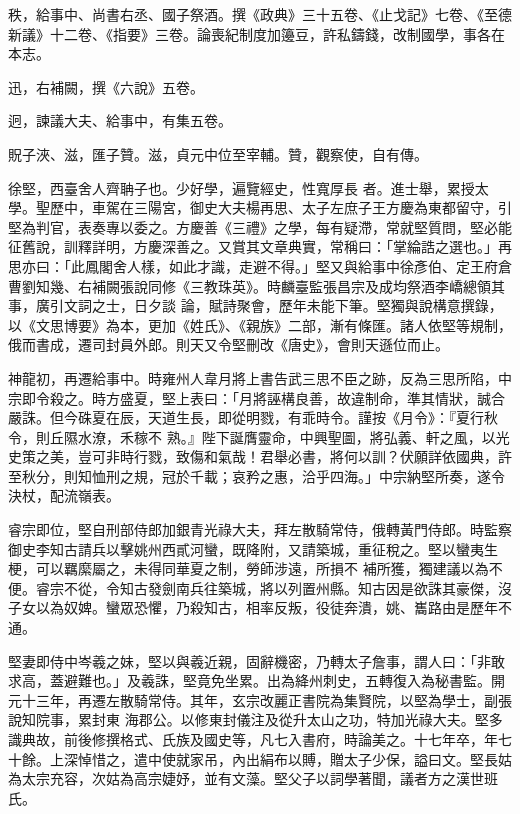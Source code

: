 \begin{pinyinscope}
 秩，給事中、尚書右丞、國子祭酒。撰《政典》三十五卷、《止戈記》七卷、《至德新議》十二卷、《指要》三卷。論喪紀制度加籩豆，許私鑄錢，改制國學，事各在本志。



 迅，右補闕，撰《六說》五卷。



 迥，諫議大夫、給事中，有集五卷。



 貺子浹、滋，匯子贊。滋，貞元中位至宰輔。贊，觀察使，自有傳。



 徐堅，西臺舍人齊聃子也。少好學，遍覽經史，性寬厚長
 者。進士舉，累授太學。聖歷中，車駕在三陽宮，御史大夫楊再思、太子左庶子王方慶為東都留守，引堅為判官，表奏專以委之。方慶善《三禮》之學，每有疑滯，常就堅質問，堅必能征舊說，訓釋詳明，方慶深善之。又賞其文章典實，常稱曰：「掌綸誥之選也。」再思亦曰：「此鳳閣舍人樣，如此才識，走避不得。」堅又與給事中徐彥伯、定王府倉曹劉知幾、右補闕張說同修《三教珠英》。時麟臺監張昌宗及成均祭酒李嶠總領其事，廣引文詞之士，日夕談
 論，賦詩聚會，歷年未能下筆。堅獨與說構意撰錄，以《文思博要》為本，更加《姓氏》、《親族》二部，漸有條匯。諸人依堅等規制，俄而書成，遷司封員外郎。則天又令堅刪改《唐史》，會則天遜位而止。



 神龍初，再遷給事中。時雍州人韋月將上書告武三思不臣之跡，反為三思所陷，中宗即令殺之。時方盛夏，堅上表曰：「月將誣構良善，故違制命，準其情狀，誠合嚴誅。但今硃夏在辰，天道生長，即從明戮，有乖時令。謹按《月令》：『夏行秋令，則丘隰水潦，禾稼不
 熟。』陛下誕膺靈命，中興聖圖，將弘義、軒之風，以光史策之美，豈可非時行戮，致傷和氣哉！君舉必書，將何以訓？伏願詳依國典，許至秋分，則知恤刑之規，冠於千載；哀矜之惠，洽乎四海。」中宗納堅所奏，遂令決杖，配流嶺表。



 睿宗即位，堅自刑部侍郎加銀青光祿大夫，拜左散騎常侍，俄轉黃門侍郎。時監察御史李知古請兵以擊姚州西貳河蠻，既降附，又請築城，重征稅之。堅以蠻夷生梗，可以羈縻屬之，未得同華夏之制，勞師涉遠，所損不
 補所獲，獨建議以為不便。睿宗不從，令知古發劍南兵往築城，將以列置州縣。知古因是欲誅其豪傑，沒子女以為奴婢。蠻眾恐懼，乃殺知古，相率反叛，役徒奔潰，姚、巂路由是歷年不通。



 堅妻即侍中岑羲之妹，堅以與羲近親，固辭機密，乃轉太子詹事，謂人曰：「非敢求高，蓋避難也。」及羲誅，堅竟免坐累。出為絳州刺史，五轉復入為秘書監。開元十三年，再遷左散騎常侍。其年，玄宗改麗正書院為集賢院，以堅為學士，副張說知院事，累封東
 海郡公。以修東封儀注及從升太山之功，特加光祿大夫。堅多識典故，前後修撰格式、氏族及國史等，凡七入書府，時論美之。十七年卒，年七十餘。上深悼惜之，遣中使就家吊，內出絹布以賻，贈太子少保，謚曰文。堅長姑為太宗充容，次姑為高宗婕妤，並有文藻。堅父子以詞學著聞，議者方之漢世班氏。




\end{pinyinscope}
